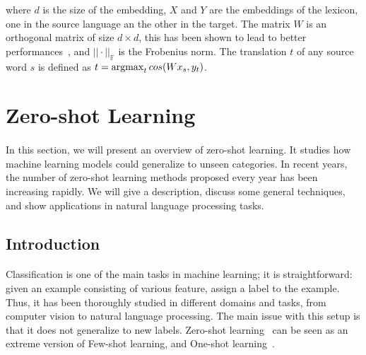 where $d$ is the size of the embedding, $X$ and $Y$ are the embeddings of the lexicon, one in the source language an the other in the target. The matrix $W$ is an orthogonal matrix of size $d\times d$, this has been shown to lead to better performances~\citep{xing-etal-2015-normalized}, and $||\cdot||_{\mathbb{F}}$ is the Frobenius norm. The translation $t$ of any source word $s$ is defined as $t = \operatorname*{argmax}_t cos(W x_s, y_t)$.




\section{Zero-shot Learning} 
\label{sec:zero_learning}

\paragraph{}

In this section, we will present an overview of zero-shot learning. It studies how machine learning models could generalize to unseen categories.  In recent years, the number of zero-shot learning methods proposed every year has been increasing rapidly. We will give a description, discuss some general techniques, and show applications in natural language processing tasks. %

\subsection{Introduction}
\paragraph{}
Classification is one of the main tasks in machine learning; it is straightforward: given an example consisting of various feature, assign a label to the example. Thus, it has been thoroughly studied in different domains and tasks, from computer vision to natural language processing.  The main issue with this setup is that it does not generalize to new labels. Zero-shot learning~\citep{larochelle2008zeroshot} can be seen as an extreme version of Few-shot learning, and One-shot learning~\citep{miller2002oneshot}.

